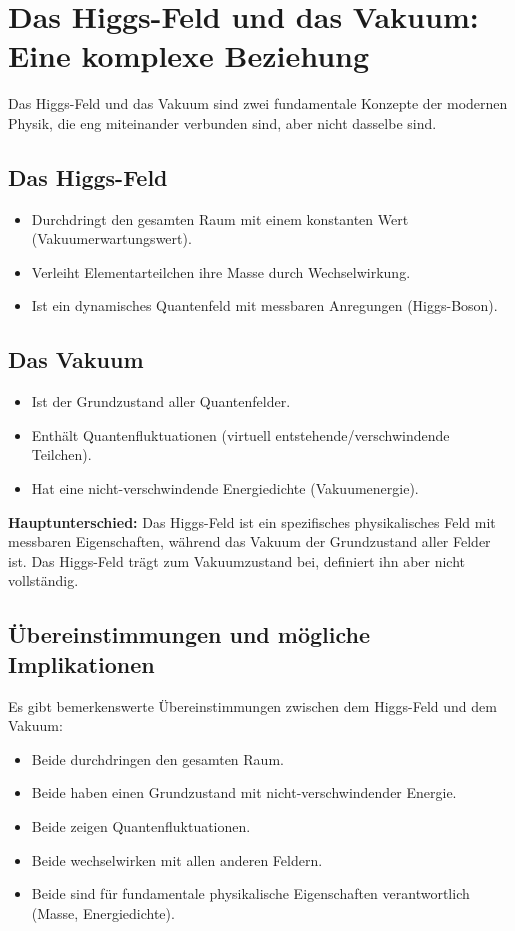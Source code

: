 \documentclass{article}
\begin{document}
	
	\section*{Das Higgs-Feld und das Vakuum: Eine komplexe Beziehung}
	
	Das Higgs-Feld und das Vakuum sind zwei fundamentale Konzepte der modernen Physik, die eng miteinander verbunden sind, aber nicht dasselbe sind.
	
	\subsection*{Das Higgs-Feld}
	
	\begin{itemize}
		\item Durchdringt den gesamten Raum mit einem konstanten Wert (Vakuumerwartungswert).
		\item Verleiht Elementarteilchen ihre Masse durch Wechselwirkung.
		\item Ist ein dynamisches Quantenfeld mit messbaren Anregungen (Higgs-Boson).
	\end{itemize}
	
	\subsection*{Das Vakuum}
	
	\begin{itemize}
		\item Ist der Grundzustand aller Quantenfelder.
		\item Enthält Quantenfluktuationen (virtuell entstehende/verschwindende Teilchen).
		\item Hat eine nicht-verschwindende Energiedichte (Vakuumenergie).
	\end{itemize}
	
	\textbf{Hauptunterschied:} Das Higgs-Feld ist ein spezifisches physikalisches Feld mit messbaren Eigenschaften, während das Vakuum der Grundzustand aller Felder ist. Das Higgs-Feld trägt zum Vakuumzustand bei, definiert ihn aber nicht vollständig.
	
	\subsection*{Übereinstimmungen und mögliche Implikationen}
	
	Es gibt bemerkenswerte Übereinstimmungen zwischen dem Higgs-Feld und dem Vakuum:
	
	\begin{itemize}
		\item Beide durchdringen den gesamten Raum.
		\item Beide haben einen Grundzustand mit nicht-verschwindender Energie.
		\item Beide zeigen Quantenfluktuationen.
		\item Beide wechselwirken mit allen anderen Feldern.
		\item Beide sind für fundamentale physikalische Eigenschaften verantwortlich (Masse, Energiedichte).
	\end{itemize}
	
\end{document}
